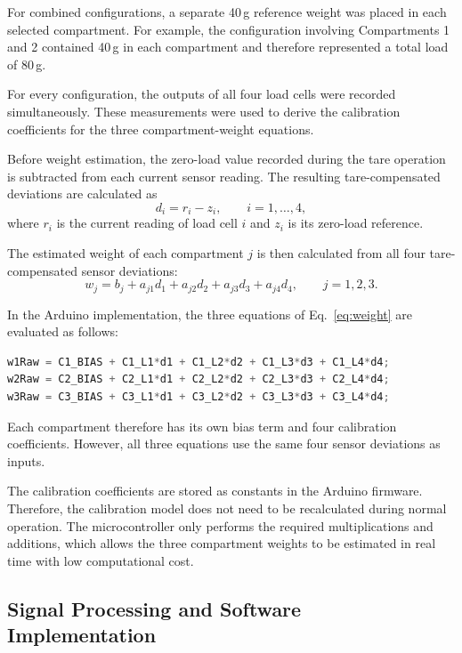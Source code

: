 \documentclass[11pt,a4paper]{article}
\begin{document}
For combined configurations, a separate 40\,g reference weight was placed in each selected compartment. For example, the configuration involving Compartments 1 and 2 contained 40\,g in each compartment and therefore represented a total load of 80\,g.

For every configuration, the outputs of all four load cells were recorded simultaneously. These measurements were used to derive the calibration coefficients for the three compartment-weight equations.

Before weight estimation, the zero-load value recorded during the tare operation is subtracted from each current sensor reading. The resulting tare-compensated deviations are calculated as
\begin{equation}
  d_i = r_i - z_i, \qquad i = 1, \ldots, 4,
  \label{eq:deviation}
\end{equation}
where $r_i$ is the current reading of load cell $i$ and $z_i$ is its zero-load reference.

The estimated weight of each compartment $j$ is then calculated from all four tare-compensated sensor deviations:
\begin{equation}
  w_j = b_j + a_{j1} d_1 + a_{j2} d_2 + a_{j3} d_3 + a_{j4} d_4, \qquad j = 1, 2, 3.
  \label{eq:weight}
\end{equation}

In the Arduino implementation, the three equations of Eq.~\eqref{eq:weight} are evaluated as follows:

\begin{lstlisting}[language=C]
w1Raw = C1_BIAS + C1_L1*d1 + C1_L2*d2 + C1_L3*d3 + C1_L4*d4;
w2Raw = C2_BIAS + C2_L1*d1 + C2_L2*d2 + C2_L3*d3 + C2_L4*d4;
w3Raw = C3_BIAS + C3_L1*d1 + C3_L2*d2 + C3_L3*d3 + C3_L4*d4;
\end{lstlisting}

Each compartment therefore has its own bias term and four calibration coefficients. However, all three equations use the same four sensor deviations as inputs.

The calibration coefficients are stored as constants in the Arduino firmware. Therefore, the calibration model does not need to be recalculated during normal operation. The microcontroller only performs the required multiplications and additions, which allows the three compartment weights to be estimated in real time with low computational cost.

\subsection{Signal Processing and Software Implementation}
\end{document}
